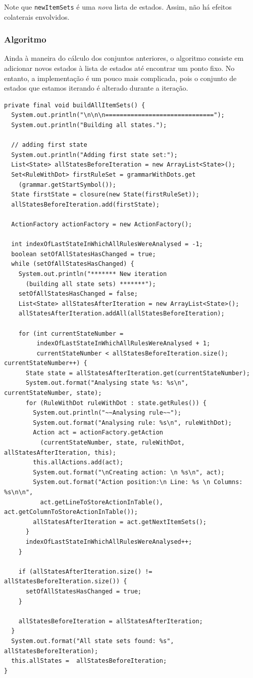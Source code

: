 \documentclass[11pt]{article}
\begin{document}
Note que \texttt{newItemSets} é uma \emph{nova} lista de estados. Assim, não há efeitos
colaterais envolvidos.

\subsubsection{Algoritmo}
\label{sec:orgheadline12}
Ainda à maneira do cálculo dos conjuntos anteriores, o algoritmo consiste em adicionar
novos estados à lista de estados até encontrar um ponto fixo. No entanto, a
implementação é um pouco mais complicada, pois o conjunto de estados que estamos
iterando é alterado durante a iteração.

\begin{verbatim}
private final void buildAllItemSets() {
  System.out.println("\n\n\n==============================");
  System.out.println("Building all states.");

  // adding first state
  System.out.println("Adding first state set:");
  List<State> allStatesBeforeIteration = new ArrayList<State>();
  Set<RuleWithDot> firstRuleSet = grammarWithDots.get
    (grammar.getStartSymbol());
  State firstState = closure(new State(firstRuleSet));
  allStatesBeforeIteration.add(firstState);

  ActionFactory actionFactory = new ActionFactory();

  int indexOfLastStateInWhichAllRulesWereAnalysed = -1;
  boolean setOfAllStatesHasChanged = true;
  while (setOfAllStatesHasChanged) {
    System.out.println("******* New iteration 
      (building all state sets) *******");
    setOfAllStatesHasChanged = false;
    List<State> allStatesAfterIteration = new ArrayList<State>();
    allStatesAfterIteration.addAll(allStatesBeforeIteration);

    for (int currentStateNumber = 
         indexOfLastStateInWhichAllRulesWereAnalysed + 1; 
         currentStateNumber < allStatesBeforeIteration.size(); currentStateNumber++) {
      State state = allStatesAfterIteration.get(currentStateNumber);
      System.out.format("Analysing state %s: %s\n", currentStateNumber, state);
      for (RuleWithDot ruleWithDot : state.getRules()) {
        System.out.println("~~Analysing rule~~");
        System.out.format("Analysing rule: %s\n", ruleWithDot);
        Action act = actionFactory.getAction
          (currentStateNumber, state, ruleWithDot, allStatesAfterIteration, this);
        this.allActions.add(act);
        System.out.format("\nCreating action: \n %s\n", act);
        System.out.format("Action position:\n Line: %s \n Columns: %s\n\n", 
          act.getLineToStoreActionInTable(), act.getColumnToStoreActionInTable());
        allStatesAfterIteration = act.getNextItemSets();
      }
      indexOfLastStateInWhichAllRulesWereAnalysed++;
    }

    if (allStatesAfterIteration.size() != allStatesBeforeIteration.size()) {
      setOfAllStatesHasChanged = true;
    }

    allStatesBeforeIteration = allStatesAfterIteration;
  }
  System.out.format("All state sets found: %s", allStatesBeforeIteration);
  this.allStates =  allStatesBeforeIteration;
}
\end{verbatim}
\end{document}
